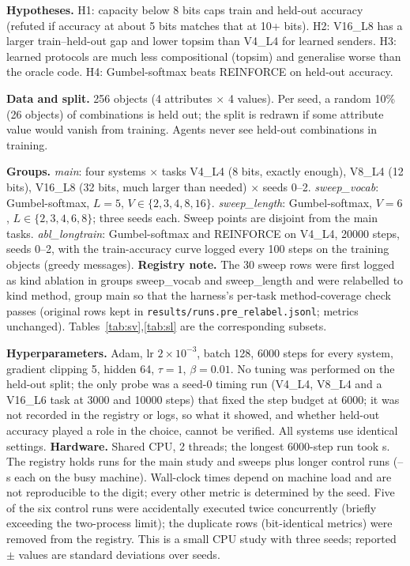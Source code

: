 \textbf{Hypotheses.} H1: capacity below 8 bits caps train and held-out accuracy (refuted if accuracy at about 5 bits matches that at 10+ bits). H2: V16\_L8 has a larger train--held-out gap and lower topsim than V4\_L4 for learned senders. H3: learned protocols are much less compositional (topsim) and generalise worse than the oracle code. H4: Gumbel-softmax beats REINFORCE on held-out accuracy.

\textbf{Data and split.} 256 objects (4 attributes $\times$ 4 values). Per seed, a random 10\% (26 objects) of combinations is held out; the split is redrawn if some attribute value would vanish from training. Agents never see held-out combinations in training.

\textbf{Groups.} \emph{main}: four systems $\times$ tasks V4\_L4 (8 bits, exactly enough), V8\_L4 (12 bits), V16\_L8 (32 bits, much larger than needed) $\times$ seeds 0--2. \emph{sweep\_vocab}: Gumbel-softmax, $L=5$, $V\in\{2,3,4,8,16\}$. \emph{sweep\_length}: Gumbel-softmax, $V=6$, $L\in\{2,3,4,6,8\}$; three seeds each. Sweep points are disjoint from the main tasks. \emph{abl\_longtrain}: Gumbel-softmax and REINFORCE on V4\_L4, 20000 steps, seeds 0--2, with the train-accuracy curve logged every 100 steps on the training objects (greedy messages). \textbf{Registry note.} The 30 sweep rows were first logged as kind ablation in groups sweep\_vocab and sweep\_length and were relabelled to kind method, group main so that the harness's per-task method-coverage check passes (original rows kept in \texttt{results/runs.pre\_relabel.jsonl}; metrics unchanged). Tables~\ref{tab:sv},\ref{tab:sl} are the corresponding subsets.

\textbf{Hyperparameters.} Adam, lr $2\times10^{-3}$, batch 128, 6000 steps for every system, gradient clipping 5, hidden 64, $\tau=1$, $\beta=0.01$. No tuning was performed on the held-out split; the only probe was a seed-0 timing run (V4\_L4, V8\_L4 and a V16\_L6 task at 3000 and 10000 steps) that fixed the step budget at 6000; it was not recorded in the registry or logs, so what it showed, and whether held-out accuracy played a role in the choice, cannot be verified. All systems use identical settings. \textbf{Hardware.} Shared CPU, 2 threads; the longest 6000-step run took  s. The registry holds  runs for the main study and sweeps plus  longer control runs (-- s each on the busy machine). Wall-clock times depend on machine load and are not reproducible to the digit; every other metric is determined by the seed. Five of the six control runs were accidentally executed twice concurrently (briefly exceeding the two-process limit); the duplicate rows (bit-identical metrics) were removed from the registry. This is a small CPU study with three seeds; reported $\pm$ values are standard deviations over seeds.
